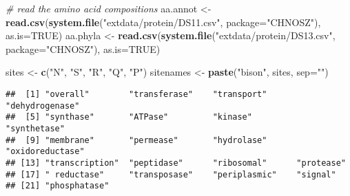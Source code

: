 \documentclass[]{article}
\newenvironment{Shaded}{\begin{snugshade}}{\end{snugshade}}
\newcommand{\KeywordTok}[1]{\textcolor[rgb]{0.13,0.29,0.53}{\textbf{#1}}}
\newcommand{\DataTypeTok}[1]{\textcolor[rgb]{0.13,0.29,0.53}{#1}}
\newcommand{\StringTok}[1]{\textcolor[rgb]{0.31,0.60,0.02}{#1}}
\newcommand{\CommentTok}[1]{\textcolor[rgb]{0.56,0.35,0.01}{\textit{#1}}}
\newcommand{\OtherTok}[1]{\textcolor[rgb]{0.56,0.35,0.01}{#1}}
\newcommand{\OperatorTok}[1]{\textcolor[rgb]{0.81,0.36,0.00}{\textbf{#1}}}
\newcommand{\NormalTok}[1]{#1}
\begin{document}
\begin{Shaded}
\begin{Highlighting}[]
\CommentTok{# read the amino acid compositions}
\NormalTok{aa.annot <-}\StringTok{ }\KeywordTok{read.csv}\NormalTok{(}\KeywordTok{system.file}\NormalTok{(}\StringTok{"extdata/protein/DS11.csv"}\NormalTok{, }\DataTypeTok{package=}\StringTok{"CHNOSZ"}\NormalTok{), }\DataTypeTok{as.is=}\OtherTok{TRUE}\NormalTok{)}
\NormalTok{aa.phyla <-}\StringTok{ }\KeywordTok{read.csv}\NormalTok{(}\KeywordTok{system.file}\NormalTok{(}\StringTok{"extdata/protein/DS13.csv"}\NormalTok{, }\DataTypeTok{package=}\StringTok{"CHNOSZ"}\NormalTok{), }\DataTypeTok{as.is=}\OtherTok{TRUE}\NormalTok{)}
\end{Highlighting}
\end{Shaded}

\begin{Shaded}
\begin{Highlighting}[]
\NormalTok{sites <-}\StringTok{ }\KeywordTok{c}\NormalTok{(}\StringTok{"N"}\NormalTok{, }\StringTok{"S"}\NormalTok{, }\StringTok{"R"}\NormalTok{, }\StringTok{"Q"}\NormalTok{, }\StringTok{"P"}\NormalTok{)}
\NormalTok{sitenames <-}\StringTok{ }\KeywordTok{paste}\NormalTok{(}\StringTok{"bison"}\NormalTok{, sites, }\DataTypeTok{sep=}\StringTok{""}\NormalTok{)}
\end{Highlighting}
\end{Shaded}

\begin{Shaded}
\end{Shaded}

\begin{verbatim}
##  [1] "overall"        "transferase"    "transport"      "dehydrogenase" 
##  [5] "synthase"       "ATPase"         "kinase"         "synthetase"    
##  [9] "membrane"       "permease"       "hydrolase"      "oxidoreductase"
## [13] "transcription"  "peptidase"      "ribosomal"      "protease"      
## [17] " reductase"     "transposase"    "periplasmic"    "signal"        
## [21] "phosphatase"
\end{verbatim}
\end{document}
